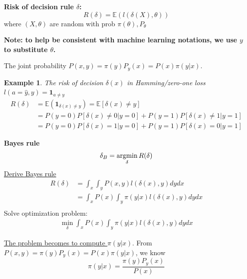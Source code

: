 \documentclass[11pt,a4paper]{article}
\newcommand{\argmin}{\operatornamewithlimits{argmin}}
\newtheorem{example}{Example}
\begin{document}
\textbf{Risk of decision rule $\delta$:} $$R(\delta)=\mathbb{E}\left(l(\delta(X),\theta)\right)$$ where $(X,\theta)$ are random with prob $\pi(\theta),P_\theta$

\textbf{Note: to help be consistent with machine learning notations, we use $y$ to substitute $\theta$.}

The joint probability $P(x,y)=\pi(y)P_y(x)=P(x)\pi(y|x)$.

\begin{example}
    The risk of decision $\delta(x)$ in Hamming/zero-one loss $l(a=\hat{y},y)=\mathbf{1}_{a\neq y}$
    \begin{equation}
        \begin{aligned}
            R(\delta)&=\mathbb{E}(\mathbf{1}_{\delta(x)\neq y})=\mathbb{E}[\delta(x)\neq y]\\
            &=P(y=0)P[\delta(x)\neq 0|y=0]+P(y=1)P[\delta(x)\neq 1|y=1]\\
            &=P(y=0)P[\delta(x)=1|y=0]+P(y=1)P[\delta(x)=0|y=1]
        \end{aligned}
        \nonumber
    \end{equation}
\end{example}

\textbf{Bayes rule}
$$\delta_B=\argmin_\delta R(\delta)$$
\underline{Derive Bayes rule}
\begin{equation}
    \begin{aligned}
        R(\delta)&=\int_x\int_y P(x,y) l(\delta(x),y) dy dx\\
        &=\int_x P(x)\int_y \pi(y|x) l(\delta(x),y) dy dx\\
    \end{aligned}
    \nonumber
\end{equation}
Solve optimization problem:
\begin{equation}
    \begin{aligned}
        \min_\delta \int_x P(x)\int_y \pi(y|x) l(\delta(x),y) dy dx
    \end{aligned}
    \nonumber
\end{equation}
\begin{center}
\end{center}
\underline{The problem becomes to compute $\pi(y|x)$}. From $P(x,y)=\pi(y)P_y(x)=P(x)\pi(y|x)$, we know $$\pi(y|x)=\frac{\pi(y)P_y(x)}{P(x)}$$
\end{document}
